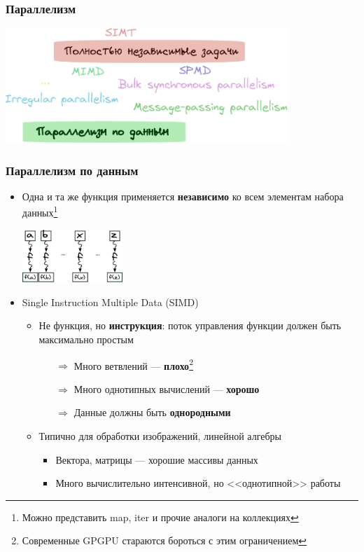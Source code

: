 \documentclass[xcolor=table,aspectratio=169]{beamer}
\begin{document}
\begin{frame}[fragile]
  \frametitle{Параллелизм}
  \begin{center}
    \includegraphics[width=0.8\textwidth]{pictures/parallel_types_crp.pdf}
  \end{center}
\end{frame}


\begin{frame}[fragile]
  \frametitle{Параллелизм по данным}
    \begin{itemize}
      \item Одна и та же функция применяется \textbf{независимо} ко всем элементам набора данных\footnote{Можно представить map, iter и прочие аналоги на коллекциях}
      \begin{center}
        \includegraphics[height=2cm]{pictures/simd_crp.pdf}
      \end{center}
    \item Single Instruction Multiple Data (SIMD)
    \begin{itemize}
      
      \item Не функция, но \textbf{инструкция}: поток управления функции должен быть максимально простым
      \begin{itemize}
        \item[$\Rightarrow$] Много ветвлений --- \textbf{плохо}\footnote{Современные GPGPU стараются бороться с этим ограничением}
        \item[$\Rightarrow$] Много однотипных вычислений --- \textbf{хорошо}
        \item[$\Rightarrow$] Данные должны быть \textbf{однородными}
      \end{itemize}
      \item Типично для обработки изображений, линейной алгебры
      \begin{itemize}
        \item Вектора, матрицы --- хорошие массивы данных
        \item Много вычислительно интенсивной, но <<однотипной>> работы
      \end{itemize}
  \end{itemize}
\end{itemize}
  
\end{frame}
\end{document}
